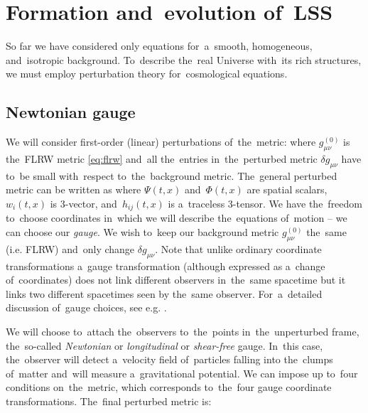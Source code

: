 \section{Formation and~evolution of~LSS}
So far we have considered only equations for~a~smooth, homogeneous, and~isotropic background. To~describe the~real Universe with~its rich structures, we must employ perturbation theory for~cosmological equations.
\subsection{Newtonian gauge}
We will consider first-order (linear) perturbations of~the~metric:
where $g_{\mu\nu}^{(0)}$ is the~FLRW metric \eqref{eq:flrw} and~all the~entries in~the~perturbed metric $\delta g_{\mu\nu}$ have to~be small with~respect to~the~background metric. The~general perturbed metric can be written as
where $\Psi(t,x)$ and~$\Phi(t,x)$ are spatial scalars, $w_i(t,x)$ is 3-vector, and~$h_{ij}(t,x)$ is a~traceless 3-tensor. We have the~freedom to~choose coordinates in~which we will describe the~equations of~motion -- we can choose our \textit{gauge}. We wish to~keep our background metric $g_{\mu\nu}^{(0)}$ the~same (i.e. FLRW) and~only change $\delta g_{\mu\nu}$. Note that unlike ordinary coordinate transformations a~gauge transformation (although expressed as a~change of~coordinates) does not link different observers in~the~same spacetime but it links two different spacetimes seen by the~same observer. For~a~detailed discussion of~gauge choices, see e.g. \textcite{PhysRevD.40.1804,10.1143/PTPS.78.1,PhysRevD.22.1882}.

We will choose to~attach the~observers to~the~points in~the~unperturbed frame, the~so-called \textit{Newtonian} or \textit{longitudinal} or \textit{shear-free} gauge. In~this case, the~observer will detect a~velocity field of~particles falling into the~clumps of~matter and~will measure a~gravitational potential. We can impose up to~four conditions on~the~metric, which corresponds to~the~four gauge coordinate transformations. The~final perturbed metric is:
